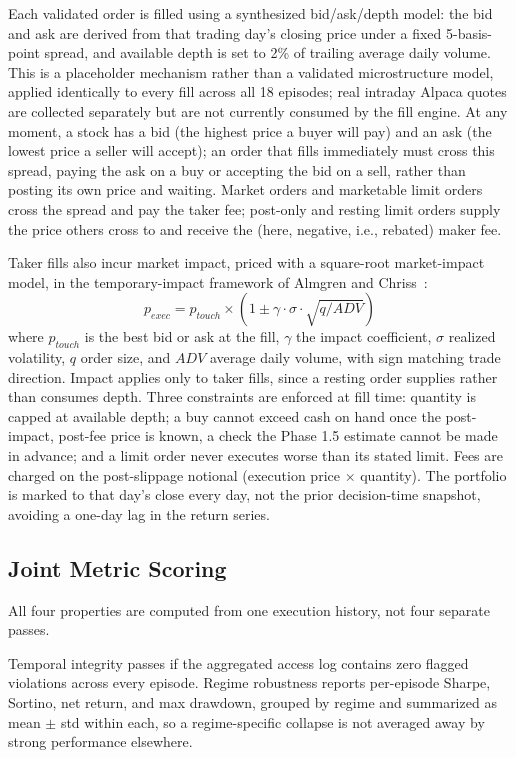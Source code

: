 \documentclass{article}
\begin{document}
Each validated order is filled using a synthesized bid/ask/depth model: the bid and ask are derived from that trading day's closing price under a fixed 5-basis-point spread, and available depth is set to 2\% of trailing average daily volume. This is a placeholder mechanism rather than a validated microstructure model, applied identically to every fill across all 18 episodes; real intraday Alpaca quotes are collected separately but are not currently consumed by the fill engine. At any moment, a stock has a bid (the highest price a buyer will pay) and an ask (the lowest price a seller will accept); an order that fills immediately must cross this spread, paying the ask on a buy or accepting the bid on a sell, rather than posting its own price and waiting. Market orders and marketable limit orders cross the spread and pay the taker fee; post-only and resting limit orders supply the price others cross to and receive the (here, negative, i.e., rebated) maker fee.

Taker fills also incur market impact, priced with a square-root market-impact model, in the temporary-impact framework of Almgren and Chriss~\cite{almgren2000}:
\[
p_{exec} = p_{touch} \times \left(1 \pm \gamma \cdot \sigma \cdot \sqrt{q / ADV}\right)
\]
where $p_{touch}$ is the best bid or ask at the fill, $\gamma$ the impact coefficient, $\sigma$ realized volatility, $q$ order size, and $ADV$ average daily volume, with sign matching trade direction. Impact applies only to taker fills, since a resting order supplies rather than consumes depth. Three constraints are enforced at fill time: quantity is capped at available depth; a buy cannot exceed cash on hand once the post-impact, post-fee price is known, a check the Phase 1.5 estimate cannot be made in advance; and a limit order never executes worse than its stated limit. Fees are charged on the post-slippage notional (execution price $\times$ quantity). The portfolio is marked to that day's close every day, not the prior decision-time snapshot, avoiding a one-day lag in the return series.

\subsection{Joint Metric Scoring}

All four properties are computed from one execution history, not four separate passes.

Temporal integrity passes if the aggregated access log contains zero flagged violations across every episode. Regime robustness reports per-episode Sharpe, Sortino, net return, and max drawdown, grouped by regime and summarized as mean $\pm$ std within each, so a regime-specific collapse is not averaged away by strong performance elsewhere.
\end{document}
